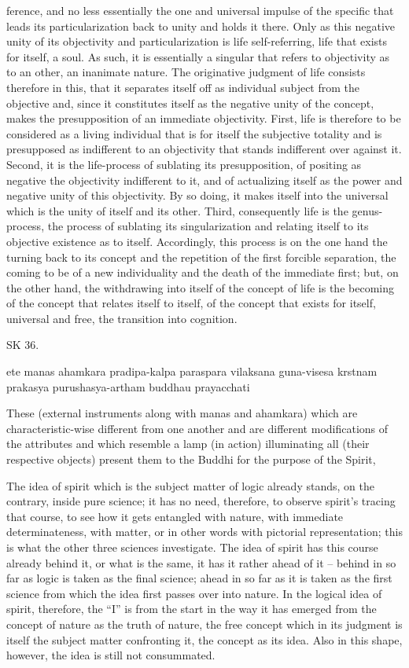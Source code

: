 ference, and no less essentially the one and universal impulse of the specific
that leads its particularization back to unity and holds it there. Only as this
negative unity of its objectivity and particularization is life self-referring, life
that exists for itself, a soul. As such, it is essentially a singular that refers to
objectivity as to an other, an inanimate nature. The originative judgment of
life consists therefore in this, that it separates itself off as individual subject
from the objective and, since it constitutes itself as the negative unity of
the concept, makes the presupposition of an immediate objectivity.
First, life is therefore to be considered as a living individual that is for itself
the subjective totality and is presupposed as indifferent to an objectivity
that stands indifferent over against it.
Second, it is the life-process of sublating its presupposition, of positing
as negative the objectivity indifferent to it, and of actualizing itself as the
power and negative unity of this objectivity. By so doing, it makes itself
into the universal which is the unity of itself and its other.
Third, consequently life is the genus-process, the process of sublating
its singularization and relating itself to its objective existence as to itself.
Accordingly, this process is on the one hand the turning back to its concept
and the repetition of the first forcible separation, the coming to be of a
new individuality and the death of the immediate first; but, on the other
hand, the withdrawing into itself of the concept of life is the becoming of
the concept that relates itself to itself, of the concept that exists for itself,
universal and free, the transition into cognition.

SK 36.

ete manas ahamkara pradipa-kalpa paraspara vilaksana
guna-visesa krstnam prakasya purushasya-artham buddhau prayacchati

These (external instruments along with manas and ahamkara)
which are characteristic-wise different from one another
and are different modifications of the attributes
and which resemble a lamp (in action) illuminating all (their respective objects)
present them to the Buddhi for the purpose of the Spirit,

The idea of spirit which is the subject matter of logic already stands,
on the contrary, inside pure science; it has no need, therefore, to observe
spirit’s tracing that course, to see how it gets entangled with nature, with
immediate determinateness, with matter, or in other words with pictorial
representation; this is what the other three sciences investigate. The idea of
spirit has this course already behind it, or what is the same, it has it rather
ahead of it – behind in so far as logic is taken as the final science; ahead
in so far as it is taken as the first science from which the idea first passes
over into nature. In the logical idea of spirit, therefore, the “I” is from the
start in the way it has emerged from the concept of nature as the truth of
nature, the free concept which in its judgment is itself the subject matter
confronting it, the concept as its idea. Also in this shape, however, the idea
is still not consummated.

